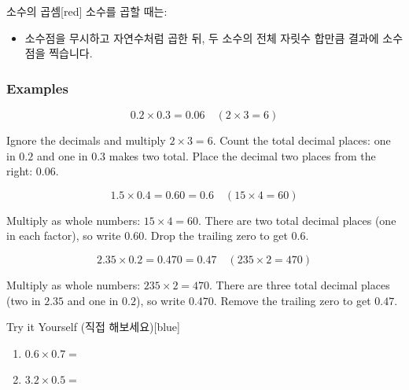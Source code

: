 \documentclass[12pt]{book}
\begin{document}
  \begin{flexbox}{소수의 곱셈}[red]
  소수를 곱할 때는:  
  \begin{itemize}
    \item 소수점을 무시하고 자연수처럼 곱한 뒤, 두 소수의 전체 자릿수 합만큼 결과에 소수점을 찍습니다.  
  \end{itemize}
  \end{flexbox}
  
  \subsubsection*{Examples}
  
  \[
  0.2 \times 0.3 = 0.06 \quad (2 \times 3 = 6)
  \]
  
  Ignore the decimals and multiply $2\times3=6$.  
  Count the total decimal places: one in $0.2$ and one in $0.3$ makes two total.  
  Place the decimal two places from the right: $0.06$.
  
  
  
  
  \[
  1.5 \times 0.4 = 0.60 = 0.6 \quad (15 \times 4 = 60)
  \]
  
  Multiply as whole numbers: $15\times4=60$.  
  There are two total decimal places (one in each factor), so write $0.60$.  
  Drop the trailing zero to get $0.6$.
  
  
  
  
  \[
  2.35 \times 0.2 = 0.470 = 0.47 \quad (235 \times 2 = 470)
  \]
  
  Multiply as whole numbers: $235\times2=470$.  
  There are three total decimal places (two in $2.35$ and one in $0.2$), so write $0.470$.  
  Remove the trailing zero to get $0.47$.
  
  
  \begin{flexbox}{Try it Yourself (직접 해보세요)}[blue]
  \begin{enumerate}
    \item $0.6 \times 0.7=$ \vspace*{20pt}
    \item $3.2 \times 0.5=$ \vspace*{20pt}
  \end{enumerate}
  \end{flexbox}
  
\end{document}
